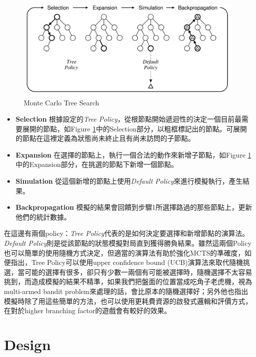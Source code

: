 \documentclass[12pt,a4paper,oneside]{book}
\begin{document}
\begin{figure}[h]
\center
\includegraphics[width=\textwidth,height=\textheight,keepaspectratio]{figures/mcts2.PNG}
\caption{Monte Carlo Tree Search \label{figMCTS}}
\end{figure}

\begin{itemize}
\item \textbf{Selection} 根據設定的\textit{Tree Policy}，從根節點開始遞迴性的決定一個目前最需要展開的節點，如Figure \ref{figMCTS}中的Selection部分，以粗框標記出的節點。可展開的節點在這裡定義為狀態尚未終止且有尚未訪問的子節點。
\item \textbf{Expansion} 在選擇的節點上，執行一個合法的動作來新增子節點，如Figure \ref{figMCTS}中的Expansion部分，在挑選的節點下新增一個節點。
\item \textbf{Simulation} 從這個新增的節點上使用\textit{Default Policy}來進行模擬執行，產生結果。
\item \textbf{Backpropagation} 模擬的結果會回饋到步驟1所選擇路過的那些節點上，更新他們的統計數據。
\end{itemize}

在這邊有兩個policy：\textit{Tree Policy}代表的是如何決定要選擇和新增節點的演算法。\textit{Default Policy}則是從該節點的狀態模擬對局直到獲得勝負結果。雖然這兩個Policy也可以簡單的使用隨機方式決定，但適當的演算法有助於強化MCTS的準確度，如\cite{Intro2MCTS}便指出，Tree Policy可以使用upper confidence bound (UCB)演算法來取代隨機挑選，當可能的選擇有很多，卻只有少數一兩個有可能被選擇時，隨機選擇不太容易挑到，而造成模擬的結果不精準，如果我們把盤面的位置當成吃角子老虎機，視為multi-armed bandit problem來處理的話，會比原本的隨機選擇好；另外他也指出模擬時除了用這些簡單的方法，也可以使用更耗費資源的啟發式邏輯和評價方式，在對於higher branching factor的遊戲會有較好的效果。

\chapter{Design}
\end{document}
